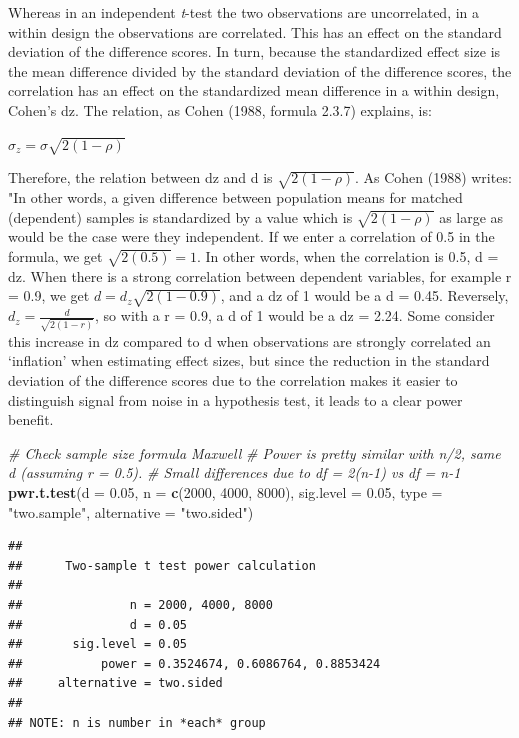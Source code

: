 \documentclass[]{book}
\newenvironment{Shaded}{\begin{snugshade}}{\end{snugshade}}
\newcommand{\CommentTok}[1]{\textcolor[rgb]{0.56,0.35,0.01}{\textit{#1}}}
\newcommand{\DataTypeTok}[1]{\textcolor[rgb]{0.13,0.29,0.53}{#1}}
\newcommand{\DecValTok}[1]{\textcolor[rgb]{0.00,0.00,0.81}{#1}}
\newcommand{\FloatTok}[1]{\textcolor[rgb]{0.00,0.00,0.81}{#1}}
\newcommand{\KeywordTok}[1]{\textcolor[rgb]{0.13,0.29,0.53}{\textbf{#1}}}
\newcommand{\NormalTok}[1]{#1}
\newcommand{\StringTok}[1]{\textcolor[rgb]{0.31,0.60,0.02}{#1}}
\begin{document}
Whereas in an independent \emph{t}-test the two observations are uncorrelated, in a within design the observations are correlated. This has an effect on the standard deviation of the difference scores. In turn, because the standardized effect size is the mean difference divided by the standard deviation of the difference scores, the correlation has an effect on the standardized mean difference in a within design, Cohen's dz. The relation, as Cohen (1988, formula 2.3.7) explains, is:

\(\sigma_{z}=\sigma\sqrt{2(1-\rho)}\)

Therefore, the relation between dz and d is \(\sqrt{2(1-\rho)}\). As Cohen (1988) writes: "In other words, a given difference between population means for matched (dependent) samples is standardized by a value which is \(\sqrt{2(1-\rho)}\) as large as would be the case were they independent. If we enter a correlation of 0.5 in the formula, we get \(\sqrt{2(0.5)}=1\). In other words, when the correlation is 0.5, d = dz. When there is a strong correlation between dependent variables, for example r = 0.9, we get \(d=d_{z}\sqrt{2(1-0.9)}\), and a dz of 1 would be a d = 0.45. Reversely, \(d_{z}=\frac{d}{\sqrt{2(1-r)}}\), so with a r = 0.9, a d of 1 would be a dz = 2.24. Some consider this increase in dz compared to d when observations are strongly correlated an `inflation' when estimating effect sizes, but since the reduction in the standard deviation of the difference scores due to the correlation makes it easier to distinguish signal from noise in a hypothesis test, it leads to a clear power benefit.

\begin{Shaded}
\begin{Highlighting}[]
\CommentTok{# Check sample size formula Maxwell}
\CommentTok{# Power is pretty similar with n/2, same d (assuming r = 0.5). }
\CommentTok{# Small differences due to df = 2(n-1) vs df = n-1}
\KeywordTok{pwr.t.test}\NormalTok{(}\DataTypeTok{d =} \FloatTok{0.05}\NormalTok{,}
           \DataTypeTok{n =} \KeywordTok{c}\NormalTok{(}\DecValTok{2000}\NormalTok{, }\DecValTok{4000}\NormalTok{, }\DecValTok{8000}\NormalTok{),}
           \DataTypeTok{sig.level =} \FloatTok{0.05}\NormalTok{,}
           \DataTypeTok{type =} \StringTok{"two.sample"}\NormalTok{,}
           \DataTypeTok{alternative =} \StringTok{"two.sided"}\NormalTok{)}
\end{Highlighting}
\end{Shaded}

\begin{verbatim}
## 
##      Two-sample t test power calculation 
## 
##               n = 2000, 4000, 8000
##               d = 0.05
##       sig.level = 0.05
##           power = 0.3524674, 0.6086764, 0.8853424
##     alternative = two.sided
## 
## NOTE: n is number in *each* group
\end{verbatim}
\end{document}
